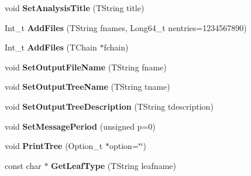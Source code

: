 \begin{DoxyCompactItemize}
\item 
\hypertarget{class_h_a_l_1_1_analysis_ab4ecf4f7c5c29027ac3eb3e3a2e3a780}{void {\bfseries Set\-Analysis\-Title} (T\-String title)}\label{class_h_a_l_1_1_analysis_ab4ecf4f7c5c29027ac3eb3e3a2e3a780}

\item 
\hypertarget{class_h_a_l_1_1_analysis_a540cf522be42290e16d6ac0c7dbff0ba}{Int\-\_\-t {\bfseries Add\-Files} (T\-String fnames, Long64\-\_\-t nentries=1234567890)}\label{class_h_a_l_1_1_analysis_a540cf522be42290e16d6ac0c7dbff0ba}

\item 
\hypertarget{class_h_a_l_1_1_analysis_af8fccc1f3c27d6402ecad559648b7ff0}{Int\-\_\-t {\bfseries Add\-Files} (T\-Chain $\ast$fchain)}\label{class_h_a_l_1_1_analysis_af8fccc1f3c27d6402ecad559648b7ff0}

\item 
\hypertarget{class_h_a_l_1_1_analysis_a9e6b12787599c0c36f576350e2e93b8d}{void {\bfseries Set\-Output\-File\-Name} (T\-String fname)}\label{class_h_a_l_1_1_analysis_a9e6b12787599c0c36f576350e2e93b8d}

\item 
\hypertarget{class_h_a_l_1_1_analysis_a50f84d17528b7ba7621c65696dd81e75}{void {\bfseries Set\-Output\-Tree\-Name} (T\-String tname)}\label{class_h_a_l_1_1_analysis_a50f84d17528b7ba7621c65696dd81e75}

\item 
\hypertarget{class_h_a_l_1_1_analysis_a6461758cc06f7a334a487d857172983a}{void {\bfseries Set\-Output\-Tree\-Description} (T\-String tdescription)}\label{class_h_a_l_1_1_analysis_a6461758cc06f7a334a487d857172983a}

\item 
\hypertarget{class_h_a_l_1_1_analysis_a4561423621e94e5593694df20f7b9c60}{void {\bfseries Set\-Message\-Period} (unsigned p=0)}\label{class_h_a_l_1_1_analysis_a4561423621e94e5593694df20f7b9c60}

\item 
\hypertarget{class_h_a_l_1_1_analysis_afccfbae795035cfe75578fa805aefa93}{void {\bfseries Print\-Tree} (Option\-\_\-t $\ast$option=\char`\"{}\char`\"{})}\label{class_h_a_l_1_1_analysis_afccfbae795035cfe75578fa805aefa93}

\item 
\hypertarget{class_h_a_l_1_1_analysis_a7c6603a4cc7b74591f5c0427f59023d5}{const char $\ast$ {\bfseries Get\-Leaf\-Type} (T\-String leafname)}\label{class_h_a_l_1_1_analysis_a7c6603a4cc7b74591f5c0427f59023d5}


\end{DoxyCompactItemize}
